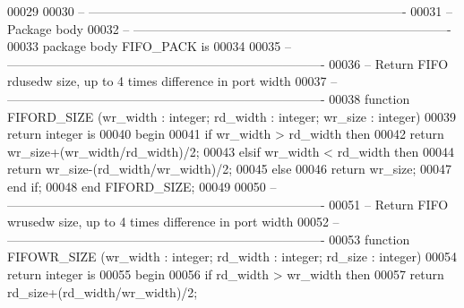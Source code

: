 \begin{DoxyCode}
00029 
00030 \textcolor{keyword}{-- ----------------------------------------------------------------------------}
00031 \textcolor{keyword}{-- Package body}
00032 \textcolor{keyword}{-- ----------------------------------------------------------------------------}
00033 \textcolor{keywordflow}{package} \textcolor{keywordflow}{body} FIFO_PACK \textcolor{keywordflow}{is}
00034 
00035 \textcolor{keyword}{-- ----------------------------------------------------------------------------}
00036 \textcolor{keyword}{-- Return FIFO rdusedw size, up to 4 times difference in port width}
00037 \textcolor{keyword}{-- ----------------------------------------------------------------------------}
00038    \textcolor{keywordflow}{function} FIFORD_SIZE (wr\_width : \textcolor{comment}{integer}; rd\_width : \textcolor{comment}{integer}; wr\_size : \textcolor{comment}{integer})  
00039       \textcolor{keywordflow}{return} \textcolor{comment}{integer} \textcolor{keywordflow}{is}     
00040    \textcolor{keywordflow}{begin}  
00041       \textcolor{keywordflow}{if} wr\_width > rd\_width \textcolor{keywordflow}{then} 
00042          \textcolor{keywordflow}{return} wr\_size+\textcolor{vhdlchar}{(}wr\_width/rd\_width\textcolor{vhdlchar}{)}/\textcolor{vhdllogic}{}\textcolor{vhdllogic}{2};
00043       \textcolor{keywordflow}{elsif} wr\_width < rd\_width \textcolor{keywordflow}{then} 
00044          \textcolor{keywordflow}{return} wr\_size-\textcolor{vhdlchar}{(}rd\_width/wr\_width\textcolor{vhdlchar}{)}/\textcolor{vhdllogic}{}\textcolor{vhdllogic}{2};
00045       \textcolor{keywordflow}{else} 
00046          \textcolor{keywordflow}{return} wr\_size;
00047       \textcolor{keywordflow}{end} \textcolor{keywordflow}{if};     
00048    \textcolor{keywordflow}{end} FIFORD\_SIZE;
00049    
00050 \textcolor{keyword}{-- ----------------------------------------------------------------------------}
00051 \textcolor{keyword}{-- Return FIFO wrusedw size, up to 4 times difference in port width}
00052 \textcolor{keyword}{-- ----------------------------------------------------------------------------}
00053    \textcolor{keywordflow}{function} FIFOWR_SIZE (wr\_width : \textcolor{comment}{integer}; rd\_width : \textcolor{comment}{integer}; rd\_size : \textcolor{comment}{integer})  
00054       \textcolor{keywordflow}{return} \textcolor{comment}{integer} \textcolor{keywordflow}{is}     
00055    \textcolor{keywordflow}{begin}  
00056       \textcolor{keywordflow}{if} rd\_width > wr\_width \textcolor{keywordflow}{then} 
00057          \textcolor{keywordflow}{return} rd\_size+\textcolor{vhdlchar}{(}rd\_width/wr\_width\textcolor{vhdlchar}{)}/\textcolor{vhdllogic}{}\textcolor{vhdllogic}{2};

\end{DoxyCode}
